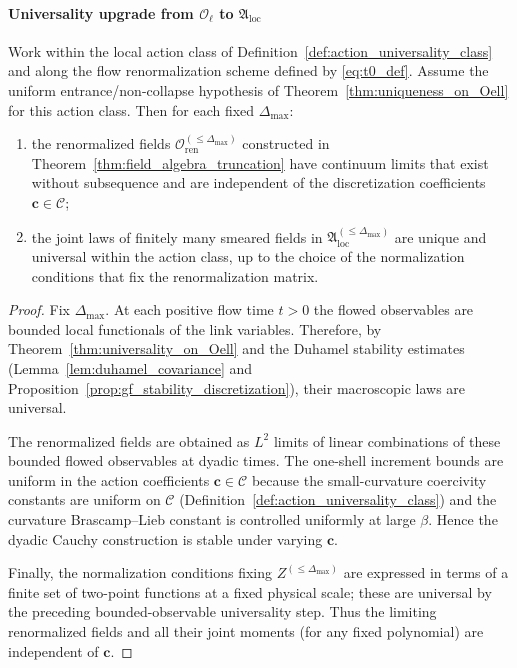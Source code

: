 \paragraph*{Universality upgrade from $\mathcal O_{\ell}$ to $\mathfrak A_{\mathrm{loc}}$}

\begin{theorem}
\label{thm:universality_local_field_algebra}
Work within the local action class of Definition~\ref{def:action_universality_class} and along the flow renormalization scheme
defined by \eqref{eq:t0_def}.
Assume the uniform entrance/non-collapse hypothesis of Theorem~\ref{thm:uniqueness_on_Oell} for this action class.
Then for each fixed $\Delta_{\max}$:
\begin{enumerate}[leftmargin=*]
\item the renormalized fields $\mathbf{\mathcal O}^{(\le \Delta_{\max})}_{\mathrm{ren}}$ constructed in
Theorem~\ref{thm:field_algebra_truncation} have continuum limits that exist without subsequence and are independent of the
discretization coefficients $\mathbf c\in\mathcal C$;
\item the joint laws of finitely many smeared fields in $\mathfrak A_{\mathrm{loc}}^{(\le \Delta_{\max})}$ are unique and universal
within the action class, up to the choice of the normalization conditions that fix the renormalization matrix.
\end{enumerate}
\end{theorem}

\begin{proof}
Fix $\Delta_{\max}$.
At each positive flow time $t>0$ the flowed observables are bounded local functionals of the link variables.
Therefore, by Theorem~\ref{thm:universality_on_Oell} and the Duhamel stability estimates
(Lemma~\ref{lem:duhamel_covariance} and Proposition~\ref{prop:gf_stability_discretization}), their macroscopic laws are universal.

The renormalized fields are obtained as $L^2$ limits of linear combinations of these bounded flowed observables at dyadic times.
The one-shell increment bounds are uniform in the action coefficients $\mathbf c\in\mathcal C$ because the small-curvature coercivity
constants are uniform on $\mathcal C$ (Definition~\ref{def:action_universality_class}) and the curvature Brascamp--Lieb constant is
controlled uniformly at large $\beta$.
Hence the dyadic Cauchy construction is stable under varying $\mathbf c$.

Finally, the normalization conditions fixing $Z^{(\le\Delta_{\max})}$ are expressed in terms of a finite set of two-point functions
at a fixed physical scale; these are universal by the preceding bounded-observable universality step.
Thus the limiting renormalized fields and all their joint moments (for any fixed polynomial) are independent of $\mathbf c$.
\end{proof}

